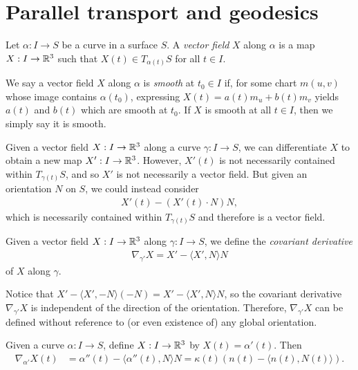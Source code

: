 \section{Parallel transport and geodesics}

\begin{defn}
    Let $\alpha: I \to S$ be a curve in a surface $S$. A \emph{vector field} $X$ along $\alpha$ is a map $X: I \to \mathbb{R}^3$ such that $X(t) \in T_{\alpha(t)}S$ for all $t \in I$.

    We say a vector field $X$ along $\alpha$ is \emph{smooth} at $t_0 \in I$ if, for some chart $m(u, v)$ whose image contains $\alpha(t_0)$, expressing $X(t) = a(t)m_u + b(t)m_v$ yields $a(t)$ and $b(t)$ which are smooth at $t_0$. If $X$ is smooth at all $t \in I$, then we simply say it is smooth.
\end{defn}

\begin{rmk}
    Given a vector field $X: I \to \mathbb{R}^3$ along a curve $\gamma: I \to S$, we can differentiate $X$ to obtain a new map $X': I \to \mathbb{R}^3$. However, $X'(t)$ is not necessarily contained within $T_{\gamma(t)}S$, and so $X'$ is not necessarily a vector field. But given an orientation $N$ on $S$, we could instead consider
    \begin{align*}
        X'(t) - \left(X'(t) \cdot N\right)N,
    \end{align*}
    which is necessarily contained within $T_{\gamma(t)}S$ and therefore is a vector field.
\end{rmk}

\begin{defn}
    Given a vector field $X: I \to \mathbb{R}^3$ along $\gamma: I \to S$, we define the \emph{covariant derivative}
    \begin{align*}
        \nabla_{\gamma'} X = X' - \langle X', N\rangle N
    \end{align*}
    of $X$ along $\gamma$.
\end{defn}

\begin{rmk}
    Notice that $X' - \langle X', -N\rangle(-N) = X' - \langle X', N\rangle N$, so the covariant derivative $\nabla_{\gamma'}X$ is independent of the direction of the orientation. Therefore, $\nabla_{\gamma'}X$ can be defined without reference to (or even existence of) any global orientation.
\end{rmk}

\begin{exmp}
    Given a curve $\alpha: I \to S$, define $X: I \to \mathbb{R}^3$ by $X(t) = \alpha'(t)$. Then
    \begin{align*}
        \nabla_{\alpha'}X(t) &= \alpha''(t) - \langle \alpha''(t), N\rangle N = \kappa(t)\left(n(t)-\langle n(t), N(t)\rangle\right).
    \end{align*}
\end{exmp}


